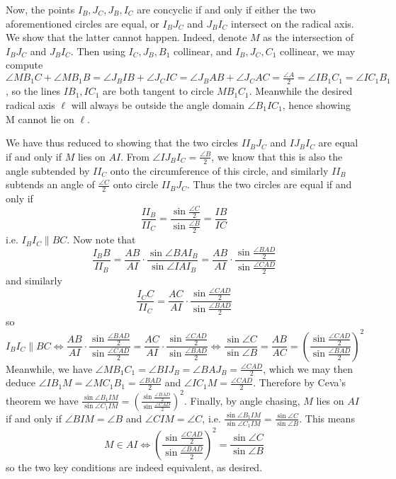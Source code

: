 \documentclass[11pt,a4paper]{article}
\begin{document}
\begin{enumerate}
    	Now, the points $I_B, J_C, J_B, I_C$ are concyclic if and only if either the two aforementioned circles are equal, 
    	or $I_BJ_C$ and $J_BI_C$ intersect on the radical axis. 
    	We show that the latter cannot happen. 
    	Indeed, denote $M$ as the intersection of $I_BJ_C$ and $J_BI_C$. 
    	Then using $I_C, J_B, B_1$  collinear, and $I_B, J_C, C_1$ collinear, we may compute $\angle MB_1C+\angle MB_1B=\angle J_BIB+\angle J_CIC=\angle J_BAB+\angle J_CAC=\frac{\angle A}{2}=\angle IB_1C_1=\angle IC_1B_1$, 
    	so the lines $IB_1, IC_1$ are both tangent to circle $MB_1C_1$. 
    	Meanwhile the desired radical axis $\ell$ will always be outside the angle domain $\angle B_1IC_1$, 
    	hence showing M cannot lie on $\ell$. 
    	
    	We have thus reduced to showing that the two circles $II_BJ_C$ and $IJ_BI_C$ are equal if and only if $M$ lies on $AI$. 
    	From $\angle IJ_BI_C=\frac{\angle B}{2}$, we know that this is also the angle subtended by $II_C$ onto the circumference of this circle, 
    	and similarly $II_B$ subtends an angle of $\frac{\angle C}{2}$ onto circle $II_BJ_C$. 
    	Thus the two circles are equal if and only if 
    	\[
    	\frac{II_B}{II_C}=\frac{\sin \frac{\angle C}{2}}{\sin \frac{\angle B}{2}}=\frac{IB}{IC}
    	\]
    	i.e. $I_BI_C\parallel BC$. 
    	Now note that 
    	\[
    	\frac{I_BB}{II_B}
    	=\frac{AB}{AI}\cdot \frac{\sin\angle BAI_B}{\sin\angle IAI_B}
    	=\frac{AB}{AI}\cdot \frac{\sin\frac{\angle BAD}{2}}{\sin\frac{\angle CAD}{2}}
    	\]
    	and similarly 
    	\[
    	\frac{I_CC}{II_C}
    	=\frac{AC}{AI}\cdot \frac{\sin\frac{\angle CAD}{2}}{\sin\frac{\angle BAD}{2}}
    	\]
    	so 
    	\[
    	I_BI_C\parallel BC
    	\Leftrightarrow 
    	\frac{AB}{AI}\cdot \frac{\sin\frac{\angle BAD}{2}}{\sin\frac{\angle CAD}{2}}
    	=\frac{AC}{AI}\cdot \frac{\sin\frac{\angle CAD}{2}}{\sin\frac{\angle BAD}{2}}
    	\Leftrightarrow \frac{\sin\angle  C}{\sin \angle B}=\frac{AB}{AC}=\left(\frac{\sin\frac{\angle CAD}{2}}{\sin\frac{\angle BAD}{2}}\right)^2
    	\]
    	Meanwhile, we have $\angle MB_1C_1 = \angle BIJ_B=\angle BAJ_B=\frac{\angle CAD}{2}$, 
    	which we may then deduce 
    	$\angle IB_1M=\angle MC_1B_1=\frac{\angle BAD}{2}$ 
    	and $\angle IC_1M=\frac{\angle CAD}{2}$. 
    	Therefore by Ceva's theorem we have 
    	$\frac{\sin\angle B_1IM}{\sin\angle C_1IM}=\left(\frac{\sin\frac{\angle BAD}{2}}{\sin\frac{\angle CAD}{2}}\right)^2$. 
    	Finally, by angle chasing, $M$ lies on $AI$ if and only if 
    	$\angle BIM=\angle B$ and $\angle CIM=\angle C$, 
    	i.e. $\frac{\sin\angle B_1IM}{\sin\angle C_1IM}=\frac{\sin\angle  C}{\sin \angle B}$. 
    	This means 
    	\[
    	M\in AI\Leftrightarrow 
    	\left(\frac{\sin\frac{\angle CAD}{2}}{\sin\frac{\angle BAD}{2}}\right)^2=\frac{\sin\angle  C}{\sin \angle B}
    	\]
    	so the two key conditions are indeed equivalent, as desired. 
    \end{enumerate}
    
\end{document}

